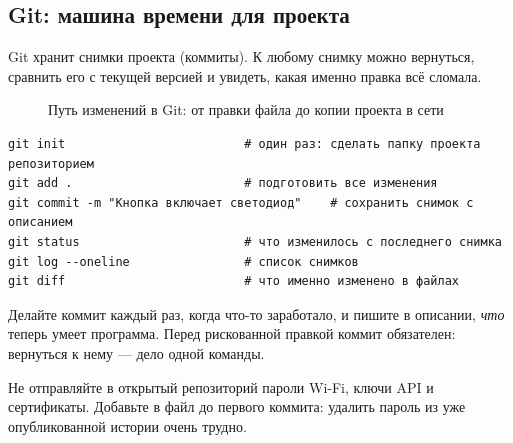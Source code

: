 \subsection{Git: машина времени для проекта}

Git хранит снимки проекта (коммиты). К любому снимку можно вернуться, сравнить его с текущей версией
и увидеть, какая именно правка всё сломала.

\begin{figure}[H]
\centering
{}
\caption{Путь изменений в Git: от правки файла до копии проекта в сети}
\end{figure}

\begin{Verbatim}[fontsize=\small,bgcolor=codebg]
git init                         # один раз: сделать папку проекта репозиторием
git add .                        # подготовить все изменения
git commit -m "Кнопка включает светодиод"    # сохранить снимок с описанием
git status                       # что изменилось с последнего снимка
git log --oneline                # список снимков
git diff                         # что именно изменено в файлах
\end{Verbatim}

Делайте коммит каждый раз, когда что-то заработало, и пишите в описании, \emph{что} теперь умеет
программа. Перед рискованной правкой коммит обязателен: вернуться к нему --- дело одной команды.

\begin{caution}
Не отправляйте в открытый репозиторий пароли Wi-Fi, ключи API и сертификаты. Добавьте 
в файл  до первого коммита: удалить пароль из уже опубликованной истории очень трудно.
\end{caution}

